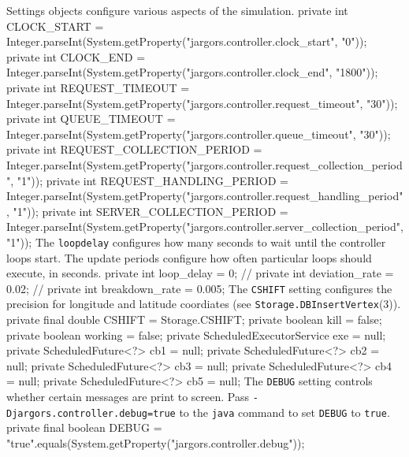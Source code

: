  Settings objects configure various aspects of the simulation.
\nwenddocs{}\endmoddef{}
private int CLOCK_START =
    Integer.parseInt(System.getProperty("jargors.controller.clock_start", "0"));
private int CLOCK_END =
    Integer.parseInt(System.getProperty("jargors.controller.clock_end", "1800"));
private int REQUEST_TIMEOUT =
    Integer.parseInt(System.getProperty("jargors.controller.request_timeout", "30"));
private int QUEUE_TIMEOUT =
    Integer.parseInt(System.getProperty("jargors.controller.queue_timeout", "30"));
private int REQUEST_COLLECTION_PERIOD =
    Integer.parseInt(System.getProperty("jargors.controller.request_collection_period", "1"));
private int REQUEST_HANDLING_PERIOD =
    Integer.parseInt(System.getProperty("jargors.controller.request_handling_period", "1"));
private int SERVER_COLLECTION_PERIOD =
    Integer.parseInt(System.getProperty("jargors.controller.server_collection_period", "1"));
\nwendcode{}\nwdocspar
The {\tt{}loop{}delay} configures how many seconds to wait until the controller
loops start. The update periods configure how often particular loops should
execute, in seconds.
\nwenddocs{}\plusendmoddef
private int loop_delay = 0;
// private int deviation_rate = 0.02;
// private int breakdown_rate = 0.005;
\nwendcode{}\nwdocspar
The {\tt{}CSHIFT} setting configures the precision for longitude and latitude
coordiates (see {\tt{}Storage.\protect{}DBInsertVertex}(3)).
\nwenddocs{}\plusendmoddef
private final double CSHIFT = Storage.CSHIFT;
private boolean kill = false;
private boolean working = false;
private ScheduledExecutorService exe = null;
private ScheduledFuture<?> cb1 = null;
private ScheduledFuture<?> cb2 = null;
private ScheduledFuture<?> cb3 = null;
private ScheduledFuture<?> cb4 = null;
private ScheduledFuture<?> cb5 = null;
\nwendcode{}\nwdocspar
The {\tt{}DEBUG} setting controls whether certain messages are print to screen.
Pass {\tt{}-Djargors.controller.debug=true} to the {\tt{}java} command to set
{\tt{}DEBUG} to {\tt{}true}.
\nwenddocs{}\plusendmoddef
private final boolean DEBUG =
    "true".equals(System.getProperty("jargors.controller.debug"));
\nwendcode{}\nwdocspar

